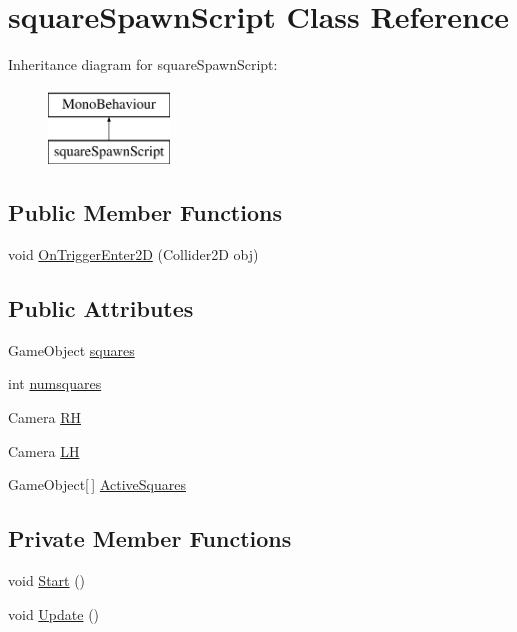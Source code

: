 \hypertarget{classsquare_spawn_script}{\section{square\-Spawn\-Script Class Reference}
\label{classsquare_spawn_script}
}
Inheritance diagram for square\-Spawn\-Script\-:\begin{figure}[H]
\begin{center}
\leavevmode
\includegraphics[height=2.000000cm]{classsquare_spawn_script}
\end{center}
\end{figure}
\subsection*{Public Member Functions}
\begin{DoxyCompactItemize}
\item 
void \hyperlink{classsquare_spawn_script_a072454e82d37b10169a363717acfc2be}{On\-Trigger\-Enter2\-D} (Collider2\-D obj)
\end{DoxyCompactItemize}
\subsection*{Public Attributes}
\begin{DoxyCompactItemize}
\item 
Game\-Object \hyperlink{classsquare_spawn_script_a353637659973cde399b46b194b30eb2e}{squares}
\item 
int \hyperlink{classsquare_spawn_script_aee81b01036a29f961a113a21183173e3}{numsquares}
\item 
Camera \hyperlink{classsquare_spawn_script_acc39770a5d684a4b5e1057b832dc979d}{R\-H}
\item 
Camera \hyperlink{classsquare_spawn_script_abf8f64837c29453bfe6231d48b06b483}{L\-H}
\item 
Game\-Object\mbox{[}$\,$\mbox{]} \hyperlink{classsquare_spawn_script_a0e6aed8ea0e260ec6dc7a811801b859d}{Active\-Squares}
\end{DoxyCompactItemize}
\subsection*{Private Member Functions}
\begin{DoxyCompactItemize}
\item 
void \hyperlink{classsquare_spawn_script_adfc7e870640ae864df5da2c89c275c21}{Start} ()
\item 
void \hyperlink{classsquare_spawn_script_a15ca0135d30bf57f8e3ba0c510217ebd}{Update} ()
\end{DoxyCompactItemize}


